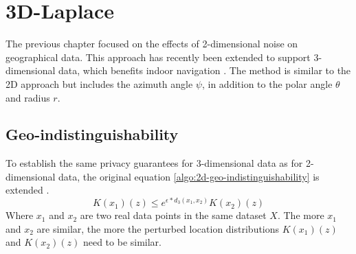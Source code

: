 \section{3D-Laplace}
The previous chapter focused on the effects of 2-dimensional noise on geographical data.
This approach has recently been extended to support 3-dimensional data, which benefits indoor navigation \citep{9646489}.
The method is similar to the 2D approach but includes the azimuth angle $\psi$, in addition to the polar angle $\theta$ and radius $r$.

\subsection{Geo-indistinguishability}
To establish the same privacy guarantees for 3-dimensional data as for 2-dimensional data, the original equation \ref{algo:2d-geo-indistinguishability} is extended \citep{9646489}.
\begin{equation}
  K(x_1)(z) \le e^{\epsilon * d_3(x_1, x_2)} K(x_2)(z)
  \label{algo:3d-geo-indistinguishability}
\end{equation}
Where $x_1$ and $x_2$ are two real data points in the same dataset $X$.
The more $x_1$ and $x_2$ are similar, the more the perturbed location distributions $K(x_1)(z)$ and $K(x_2)(z)$ need to be similar.
